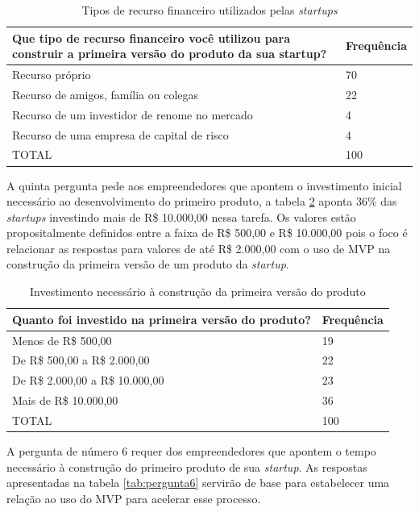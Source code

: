 \begin{table}[hb]
\centering
\caption{Tipos de recurso financeiro utilizados pelas \emph{startups}}
\label{tab:pergunta4}
\begin{tabular}{|p{10cm}|p{2cm}|}
\hline{\bf Que tipo de recurso financeiro voc\^e utilizou para construir a primeira vers\~ao do produto da sua startup?} & {\bf Frequ\^encia}\\
\hline Recurso pr\'oprio & 70\\
\hline Recurso de amigos, fam\'ilia ou colegas & 22\\
\hline Recurso de um investidor de renome no mercado & 4\\
\hline Recurso de uma empresa de capital de risco & 4\\
\hline TOTAL & 100\\
\hline
\end{tabular}
\end{table}

A quinta pergunta pede aos empreendedores que apontem o investimento inicial necess\'ario ao desenvolvimento do primeiro produto, a tabela \ref{tab:pergunta5} aponta 36\% das \emph{startups} investindo mais de R\$ 10.000,00 nessa tarefa. Os valores est\~ao propositalmente definidos entre a faixa de R\$ 500,00 e R\$ 10.000,00 pois o foco \'e relacionar as respostas para valores de at\'e R\$ 2.000,00 com o uso de MVP na constru\c{c}\~ao da primeira vers\~ao de um produto da \emph{startup}.

\begin{table}[hb]
\centering
\caption{Investimento necess\'ario \`a constru\c{c}\~ao da primeira vers\~ao do produto}
\label{tab:pergunta5}
\begin{tabular}{|p{10cm}|p{2cm}|}
\hline{\bf Quanto foi investido na primeira vers\~ao do produto?} & {\bf Frequ\^encia}\\
\hline Menos de R\$ 500,00 & 19\\
\hline De R\$ 500,00 a R\$ 2.000,00 & 22\\
\hline De R\$ 2.000,00 a R\$ 10.000,00 & 23\\
\hline Mais de R\$ 10.000,00 & 36\\
\hline TOTAL & 100\\
\hline
\end{tabular}
\end{table}

\pagebreak

A pergunta de n\'umero 6 requer dos empreendedores que apontem o tempo necess\'ario \`a constru\c{c}\~ao do primeiro produto de sua \emph{startup}. As respostas apresentadas na tabela \ref{tab:pergunta6} servir\~ao de base para estabelecer uma rela\c{c}\~ao ao uso do MVP para acelerar esse processo.

